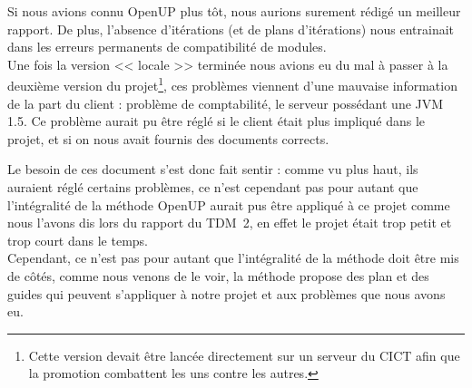 \documentclass[a4paper, 12pt]{article}
\begin{document}
	Si nous avions connu OpenUP plus tôt, nous aurions surement rédigé un meilleur rapport. De plus, l'absence d'itérations (et de plans d'itérations)
	nous entrainait dans les erreurs permanents de compatibilité de modules.\\
	Une fois la version << locale >> terminée nous avions eu du mal à passer à la deuxième version du projet\footnote{Cette version devait être lancée
	directement sur un serveur du CICT afin que la promotion combattent les uns contre les autres.}, ces problèmes viennent d'une mauvaise information
	de la part du client : problème de comptabilité, le serveur possédant une JVM 1.5. Ce problème aurait pu être réglé si le client était plus impliqué
	dans le projet, et si on nous avait fournis des documents corrects.

	Le besoin de ces document s'est donc fait sentir : comme vu plus haut, ils auraient réglé certains problèmes, ce n'est cependant pas pour autant que
	l'intégralité de la méthode OpenUP aurait pus être appliqué à ce projet comme nous l'avons dis lors du rapport du TDM~\no{}2, en effet le projet
	était trop petit et trop court dans le temps. \\
	Cependant, ce n'est pas pour autant que l'intégralité de la méthode doit être mis de côtés, comme nous venons de le voir, la méthode propose des
	plan et des guides qui peuvent s'appliquer à notre projet et aux problèmes que nous avons eu.
\end{document}
